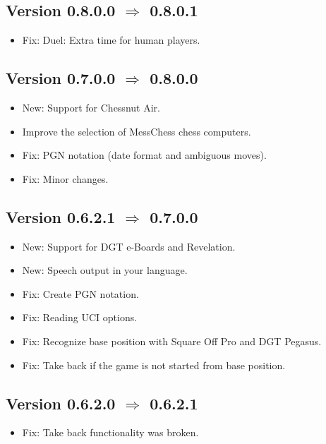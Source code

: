 \documentclass[11pt,a4paper]{article}
\begin{document}
\subsection*{Version 0.8.0.0 $\Rightarrow$  0.8.0.1}
\begin{itemize}
	\item {\color{red}Fix}: Duel: Extra time for human players.
\end{itemize}

\subsection*{Version 0.7.0.0 $\Rightarrow$  0.8.0.0}
\begin{itemize}
	\item {\color{blue}New}: Support for Chessnut Air.
	\item Improve the selection of MessChess chess computers.
	\item {\color{red}Fix}: PGN notation (date format and ambiguous moves).
	\item {\color{red}Fix}: Minor changes.
\end{itemize}

\subsection*{Version 0.6.2.1 $\Rightarrow$  0.7.0.0}
\begin{itemize}
	\item {\color{blue}New}: Support for DGT e-Boards and Revelation.
	\item {\color{blue}New}: Speech output in your language.
	\item {\color{red}Fix}: Create PGN notation.
    \item {\color{red}Fix}: Reading UCI options.
	\item {\color{red}Fix}: Recognize base position with Square Off Pro and DGT Pegasus.
	\item {\color{red}Fix}: Take back if the game is not started from base position.
\end{itemize}

\subsection*{Version 0.6.2.0 $\Rightarrow$  0.6.2.1}
\begin{itemize}
	\item {\color{red}Fix}: Take back functionality was broken.
\end{itemize}
\end{document}
